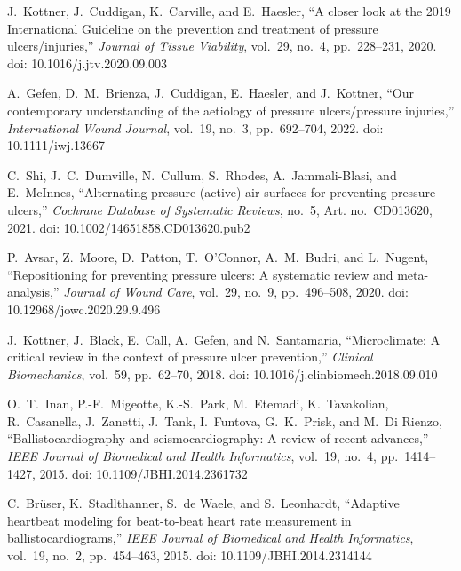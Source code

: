 ﻿\documentclass[11pt,a4paper]{article}
\begin{document}
\begin{enumerate}[leftmargin=*, label={[\arabic*]}, itemsep=0.10em, parsep=0pt, topsep=0.08em]
    \small
    \sloppy
    \item J.~Kottner, J.~Cuddigan, K.~Carville, and E.~Haesler, ``A closer look at the 2019 International Guideline on the prevention and treatment of pressure ulcers/injuries,'' \textit{Journal of Tissue Viability}, vol.~29, no.~4, pp.~228--231, 2020. doi: 10.1016/j.jtv.2020.09.003
    
    \item A.~Gefen, D.~M.~Brienza, J.~Cuddigan, E.~Haesler, and J.~Kottner, ``Our contemporary understanding of the aetiology of pressure ulcers/pressure injuries,'' \textit{International Wound Journal}, vol.~19, no.~3, pp.~692--704, 2022. doi: 10.1111/iwj.13667
    
    \item C.~Shi, J.~C.~Dumville, N.~Cullum, S.~Rhodes, A.~Jammali-Blasi, and E.~McInnes, ``Alternating pressure (active) air surfaces for preventing pressure ulcers,'' \textit{Cochrane Database of Systematic Reviews}, no.~5, Art. no.~CD013620, 2021. doi: 10.1002/14651858.CD013620.pub2
    
    \item P.~Avsar, Z.~Moore, D.~Patton, T.~O'Connor, A.~M.~Budri, and L.~Nugent, ``Repositioning for preventing pressure ulcers: A systematic review and meta-analysis,'' \textit{Journal of Wound Care}, vol.~29, no.~9, pp.~496--508, 2020. doi: 10.12968/jowc.2020.29.9.496
    
    \item J.~Kottner, J.~Black, E.~Call, A.~Gefen, and N.~Santamaria, ``Microclimate: A critical review in the context of pressure ulcer prevention,'' \textit{Clinical Biomechanics}, vol.~59, pp.~62--70, 2018. doi: 10.1016/j.clinbiomech.2018.09.010
    
    \item O.~T.~Inan, P.-F.~Migeotte, K.-S.~Park, M.~Etemadi, K.~Tavakolian, R.~Casanella, J.~Zanetti, J.~Tank, I.~Funtova, G.~K.~Prisk, and M.~Di Rienzo, ``Ballistocardiography and seismocardiography: A review of recent advances,'' \textit{IEEE Journal of Biomedical and Health Informatics}, vol.~19, no.~4, pp.~1414--1427, 2015. doi: 10.1109/JBHI.2014.2361732
    
    \item C.~Br\"{u}ser, K.~Stadlthanner, S.~de Waele, and S.~Leonhardt, ``Adaptive heartbeat modeling for beat-to-beat heart rate measurement in ballistocardiograms,'' \textit{IEEE Journal of Biomedical and Health Informatics}, vol.~19, no.~2, pp.~454--463, 2015. doi: 10.1109/JBHI.2014.2314144
    

\end{enumerate}
\end{document}
